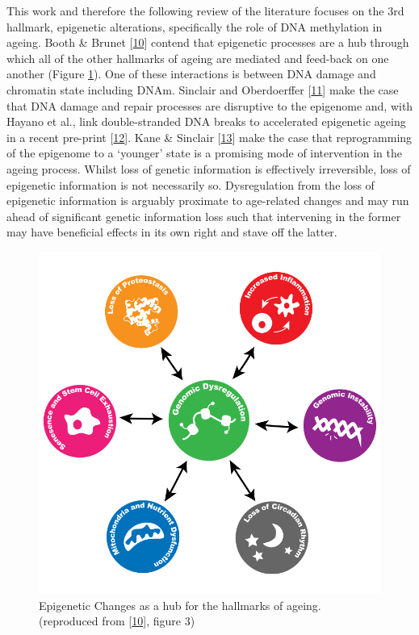 \documentclass[
]{book}
\begin{document}
This work and therefore the following review of the literature focuses on the 3rd hallmark, epigenetic alterations, specifically the role of DNA methylation in ageing.
Booth \& Brunet {[}\protect\hyperlink{ref-Booth2016}{10}{]} contend that epigenetic processes are a hub through which all of the other hallmarks of ageing are mediated and feed-back on one another (Figure \ref{fig:Booth2016fig3}).
One of these interactions is between DNA damage and chromatin state including DNAm.
Sinclair and Oberdoerffer {[}\protect\hyperlink{ref-Sinclair2009}{11}{]} make the case that DNA damage and repair processes are disruptive to the epigenome and, with Hayano et al., link double-stranded DNA breaks to accelerated epigenetic ageing in a recent pre-print {[}\protect\hyperlink{ref-Hayano2019}{12}{]}.
Kane \& Sinclair {[}\protect\hyperlink{ref-Kane2019}{13}{]} make the case that reprogramming of the epigenome to a `younger' state is a promising mode of intervention in the ageing process.
Whilst loss of genetic information is effectively irreversible, loss of epigenetic information is not necessarily so.
Dysregulation from the loss of epigenetic information is arguably proximate to age-related changes and may run ahead of significant genetic information loss such that intervening in the former may have beneficial effects in its own right and stave off the latter.

\begin{figure}

{\centering \includegraphics[width=0.6\linewidth]{figs/Booth2016_F3_epigenomeHubAgingHallmarks_alpha} 

}

\caption{Epigenetic Changes as a hub for the hallmarks of ageing. (reproduced from {[}\protect\hyperlink{ref-Booth2016}{10}{]}, figure 3)}\label{fig:Booth2016fig3}
\end{figure}
\end{document}
